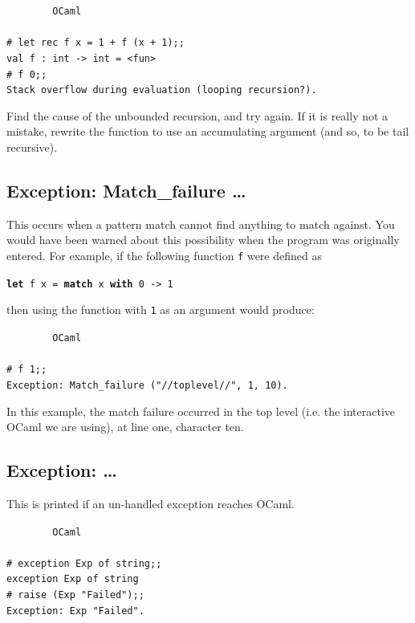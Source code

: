 \documentclass[]{book}
\newcommand{\smspace}{\vspace{4mm}}
\begin{document}
\smspace
\noindent\verb!        OCaml!\\
\noindent\\
\texttt{\# let rec f x = 1 + f (x + 1);;}\\
\texttt{val f :\ int -> int = <fun>}\\
\texttt{\# f 0;;}\\
\texttt{Stack overflow during evaluation (looping recursion?).}
\smspace

\noindent Find the cause of the unbounded recursion, and try again. If it is really not a mistake, rewrite the function to use an accumulating argument (and so, to be tail recursive).

\subsection*{Exception: Match\_failure \ldots}

This occurs when a pattern match cannot find anything to match against. You would have been warned about this possibility when the program was originally entered. For example, if the following function \texttt{f} were defined as 

\smspace
\texttt{\textbf{let} f x = \textbf{match} x \textbf{with} 0 -> 1}
\smspace

\noindent then using the function with \texttt{1} as an argument would produce:

\smspace
\noindent\verb!        OCaml!\\
\noindent\\
\texttt{\# f 1;;}\\
\texttt{Exception:\ Match\_failure ("//toplevel//", 1, 10).}
\smspace

\noindent In this example, the match failure occurred in the top level (i.e. the interactive OCaml we are using), at line one, character ten.

\subsection*{Exception: \ldots}

This is printed if an un-handled exception reaches OCaml.

\smspace
\noindent\verb!        OCaml!\\
\noindent\\
\texttt{\# exception Exp of string;;}\\
\texttt{exception Exp of string}\\
\texttt{\# raise (Exp "Failed");;}\\
\texttt{Exception:\ Exp "Failed".}
\smspace
\end{document}
